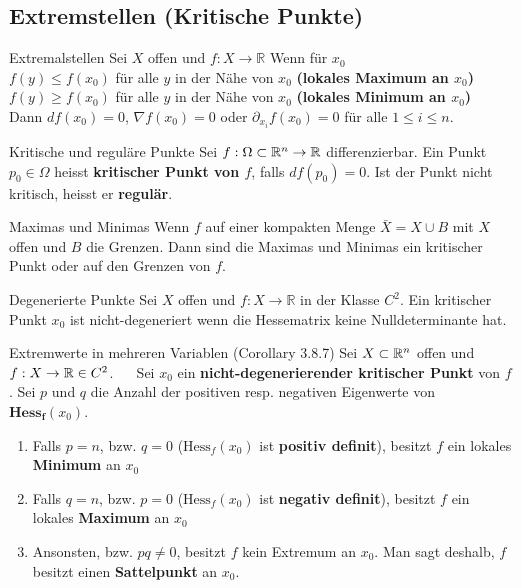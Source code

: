 \subsection{Extremstellen (Kritische Punkte)}

\begin{Satz}{Extremalstellen}{}
	Sei $X$ offen und $f:X\rightarrow \mathbb{R}$ Wenn für $x_0$\\
	$f(y) \le f(x_0)$ für alle $y$ in der Nähe von $x_0$ \textbf{(lokales Maximum an $x_0$)}\\
	$f(y) \ge f(x_0)$ für alle $y$ in der Nähe von $x_0$ \textbf{(lokales Minimum an $x_0$)}\\
	Dann $df(x_0) = 0$, $\nabla f(x_0)=0$ oder $\partial_{x_i}f(x_0) = 0$ für alle $1 \leq i \leq n$.
\end{Satz}

\begin{Definition}[label=R1]{Kritische und reguläre Punkte}{}
	Sei $f: \Omega \subset \mathbb{R}^n \to \mathbb{R}$ differenzierbar. Ein Punkt $p_0 \in \Omega$ heisst \textbf{kritischer Punkt von $f$}, falls $df(p_0)=0$. Ist der Punkt nicht kritisch, heisst er \textbf{regulär}.\\
\end{Definition}
\begin{Satz}{Maximas und Minimas}{}
	Wenn $f$ auf einer kompakten Menge $\bar{X} = X \cup B$ mit $X$ offen und $B$ die Grenzen. Dann sind die Maximas und Minimas ein kritischer Punkt oder auf den Grenzen von $f$.
\end{Satz}

\begin{Definition}{Degenerierte Punkte}{}
	Sei $X$ offen und $f:X\rightarrow \mathbb{R}$ in der Klasse $C^2$. Ein kritischer Punkt $x_0$ ist
	nicht-degeneriert wenn die Hessematrix keine Nulldeterminante hat.
\end{Definition}

\begin{Satz}{Extremwerte in mehreren Variablen (Corollary 3.8.7)}{}
	Sei $X\subset \mathbb{R}^n$ offen und $f: X \rightarrow \mathbb{R} \in C^2$. ~~
	Sei $x_0$ ein \textbf{nicht-degenerierender kritischer Punkt} von $f$. Sei $p$ und $q$ die Anzahl der positiven resp. negativen Eigenwerte von $\mathbf{Hess_f}(x_0)$.

	\begin{enumerate}
		\item Falls $p=n$, bzw. $q=0$ ($\text{Hess}_f(x_0)$ ist \textbf{positiv definit}), besitzt $f$ ein lokales \textbf{Minimum} an $x_0$
		\item Falls $q=n$, bzw. $p=0$ ($\text{Hess}_f(x_0)$ ist \textbf{negativ definit}), besitzt $f$ ein lokales \textbf{Maximum} an $x_0$
		\item Ansonsten, bzw. $pq\neq 0$, besitzt $f$ kein Extremum an $x_0$. Man sagt deshalb, $f$ besitzt einen \textbf{Sattelpunkt} an $x_0$.
	\end{enumerate}
\end{Satz}

